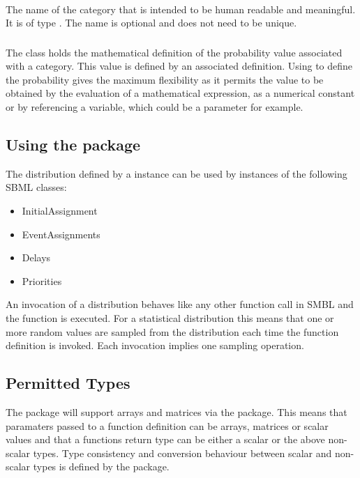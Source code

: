 \documentclass[draftspec]{sbmlpkgspec}
\begin{document}
\paragraph{}

The name of the category that is intended to be human readable and
meaningful. It is of type . The name is optional and does
not need to be unique.

\subsubsection{}

The  class holds the mathematical definition of the
probability value associated with a category. This value is defined by
an associated \mathml definition. Using \mathml to define the
probability gives the maximum flexibility as it permits the value to
be obtained by the evaluation of a mathematical expression, as a
numerical constant or by referencing a variable, which could be a
parameter for example.

\subsection{Using the \distribshort package}

The distribution defined by a \FunctionDefinition instance can be
used by instances of the following SBML classes:

\begin{itemize}
  \item InitialAssignment
  \item EventAssignments
  \item Delays
  \item Priorities
\end{itemize}

An invocation of a distribution behaves like any other function call
in SMBL and the function is executed. For a statistical distribution
this means that one or more random values are sampled from the distribution
each time the function definition is invoked. Each invocation implies
one sampling operation.

\subsection{Permitted Types}

The \distrib package will support arrays and matrices via the \arrays
package. This means that paramaters passed to a function definition
can be arrays, matrices or scalar values and that a functions return
type can be either a scalar or the above non-scalar types. Type
consistency and conversion behaviour between scalar and non-scalar
types is defined by the \arrays package.
\end{document}
